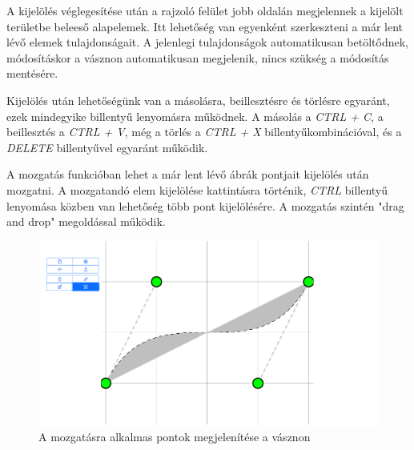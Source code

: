 A kijelölés véglegesítése után a rajzoló felület jobb oldalán megjelennek a kijelölt területbe beleeső alapelemek. Itt lehetőség van egyenként szerkeszteni a már lent lévő elemek tulajdonságait. A jelenlegi tulajdonságok automatikusan betöltődnek, módosításkor a vásznon automatikusan megjelenik, nincs szükség a módosítás mentésére.

Kijelölés után lehetőségünk van a másolásra, beillesztésre és törlésre egyaránt, ezek mindegyike billentyű lenyomásra működnek. A másolás a  \textit{CTRL + C}, a beillesztés a \textit{CTRL + V}, még a törlés a \textit{CTRL + X} billentyűkombinációval, és a \textit{DELETE} billentyűvel egyaránt működik.


A mozgatás funkcióban lehet a már lent lévő ábrák pontjait kijelölés után mozgatni. A mozgatandó elem kijelölése kattintásra történik, \textit{CTRL} billentyű lenyomása közben van lehetőség több pont kijelölésére. A mozgatás szintén "drag and drop" megoldással működik.

\begin{figure}[!h]
	\label{fig:move}
	\centering
	\includegraphics[width=\textwidth]{images/editor_move.png}
	\caption{A mozgatásra alkalmas pontok megjelenítése a vásznon}
\end{figure}


